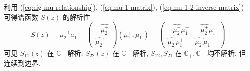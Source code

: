 利用 (\ref{eq:eig-mu-relationship}), (\ref{eq:mu-1-matrix}), (\ref{eq:mu-1-2-inverse-matrix}) 可得谱函数 $ S(z) $ 的解析性
\begin{equation}
  S(z) = \mu_{2}^{-1} \mu_{1} = \begin{pmatrix} - \hat{\mu_{2}^{+}} \\ \hat{\mu_{2}^{-}} \end{pmatrix} (\mu_{1}^{+}, \mu_{1}^{-}) 
  = \begin{pmatrix} - \hat{\mu_{2}^{+}} \mu_{1}^{+} & - \hat{\mu_{2}^{+}} \mu_{1}^{-} \\ \hat{\mu_{2}^{-}} \mu_{1}^{+} & \hat{\mu_{2}^{-}} \mu_{1}^{-} \end{pmatrix}
\end{equation}
可见 $ S_{11}(z) $ 在 $ \mathbb{C}_{+} $ 解析, $ S_{22}(z) $ 在 $ \mathbb{C}_{-} $ 解析, $ S_{12}, S_{21} $ 在 $ \mathbb{C}_{+}, \mathbb{C}_{-} $ 均不解析, 但连续到边界.

